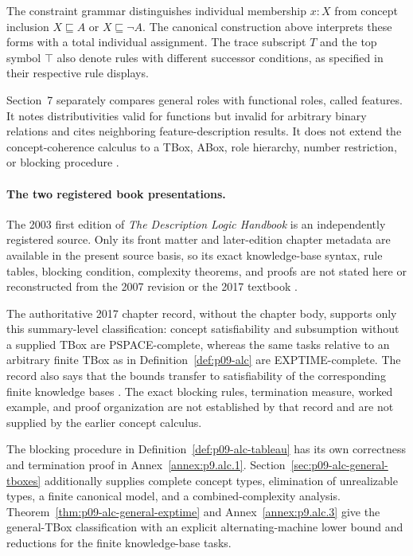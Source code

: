 The constraint grammar distinguishes individual membership \(x:X\) from
concept inclusion \(X\sqsubseteq A\) or \(X\sqsubseteq\neg A\).
The canonical construction above interprets these forms with a total
individual assignment.  The trace subscript \(T\) and the top symbol
\(\top\) also denote rules with different successor conditions, as
specified in their respective rule displays.

Section~7 separately compares general roles with functional roles, called
features.  It notes distributivities valid for functions but invalid for
arbitrary binary relations and cites neighboring feature-description results.
It does not extend the concept-coherence calculus to a TBox, ABox, role
hierarchy, number restriction, or blocking procedure
\cite[\S7, pp.~22--24]{SchmidtSchaussSmolka1991}.

\paragraph{The two registered book presentations.}
The 2003 first edition of \emph{The Description Logic Handbook} is an
independently registered source.  Only its front matter and later-edition
chapter metadata are available in the present source basis, so its exact
knowledge-base syntax, rule tables, blocking condition, complexity theorems,
and proofs are not stated here or reconstructed from the 2007 revision or the
2017 textbook \cite{BaaderEtAl2003}.

The authoritative 2017 chapter record, without the chapter body, supports only
this summary-level classification: concept satisfiability and subsumption
without a supplied TBox are PSPACE-complete, whereas the same tasks relative
to an arbitrary finite TBox as in
Definition~\ref{def:p09-alc} are EXPTIME-complete.  The record also says that
the bounds transfer to satisfiability of the corresponding finite knowledge
bases \cite{BaaderHorrocksLutzSattler2017}.  The exact blocking rules,
termination measure, worked example, and proof organization are not established
by that record and are not supplied by the earlier concept calculus.

The blocking procedure in Definition~\ref{def:p09-alc-tableau} has its
own correctness and termination proof in Annex~\ref{annex:p9.alc.1}.
Section~\ref{sec:p09-alc-general-tboxes} additionally supplies complete
concept types, elimination of unrealizable types, a finite canonical model,
and a combined-complexity analysis.  Theorem~\ref{thm:p09-alc-general-exptime}
and Annex~\ref{annex:p9.alc.3} give the general-TBox classification with
an explicit alternating-machine lower bound and reductions for the finite
knowledge-base tasks.

